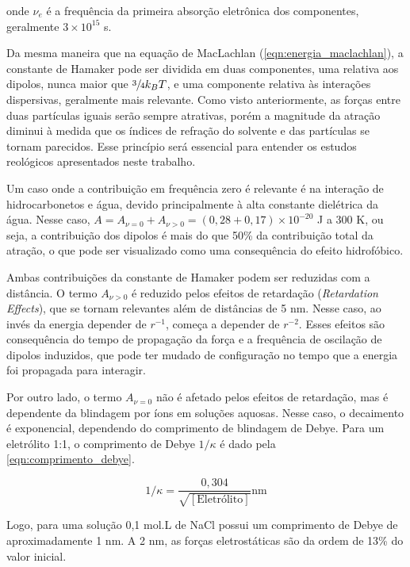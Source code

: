 	\noindent onde \(\nu_e\) é a frequência da primeira absorção eletrônica dos componentes, geralmente \(3 \times 10^{15}\) s\menosUm.
	
	Da mesma maneira que na equação de MacLachlan (\autoref{eqn:energia_maclachlan}), a constante de Hamaker pode ser dividida em duas componentes, uma relativa aos dipolos, nunca maior que \(\sfrac{3}{4}k_BT\), e uma componente relativa às interações dispersivas, geralmente mais relevante. Como visto anteriormente, as forças entre duas partículas iguais serão sempre atrativas, porém a magnitude da atração diminui à medida que os índices de refração do solvente e das partículas se tornam parecidos. Esse princípio será essencial para entender os estudos reológicos apresentados neste trabalho.
	
	Um caso onde a contribuição em frequência zero é relevante é na interação de hidrocarbonetos e água, devido principalmente à alta constante dielétrica da água. Nesse caso, \(A = A_{\nu=0} + A_{\nu>0} = (0,28 + 0,17) \times 10^{-20} \) J a 300 K, ou seja, a contribuição dos dipolos é mais do que 50\% da contribuição total da atração, o que pode ser visualizado como uma consequência do efeito hidrofóbico.
	
	Ambas contribuições da constante de Hamaker podem ser reduzidas com a distância. O termo \(A_{\nu > 0}\) é reduzido pelos efeitos de retardação (\emph{Retardation Effects}), que se tornam relevantes além de distâncias de 5 nm. Nesse caso, ao invés da energia depender de \(r^{-1}\), começa a depender de \(r^{-2}\). Esses efeitos são consequência do tempo de propagação da força e a frequência de oscilação de dipolos induzidos, que pode ter mudado de configuração no tempo que a energia foi propagada para interagir.
	
	Por outro lado, o termo \(A_{\nu = 0}\) não é afetado pelos efeitos de retardação, mas é dependente da blindagem por íons em soluções aquosas. Nesse caso, o decaimento é exponencial, dependendo do comprimento de blindagem de Debye. Para um eletrólito 1:1, o comprimento de Debye \(1/\kappa\) é dado pela \autoref{eqn:comprimento_debye}.
	
	\begin{equation}
		1/\kappa = \dfrac{0{,}304}{\sqrt{\left[ \mathrm{Eletrólito} \right] }} \textrm{nm}
		\label{eqn:comprimento_debye}
	\end{equation} 
	
	Logo, para uma solução 0,1 mol.L\menosUm{} de NaCl possui um comprimento de Debye de aproximadamente 1 nm. A 2 nm, as forças eletrostáticas são da ordem de 13\% do valor inicial.
	
